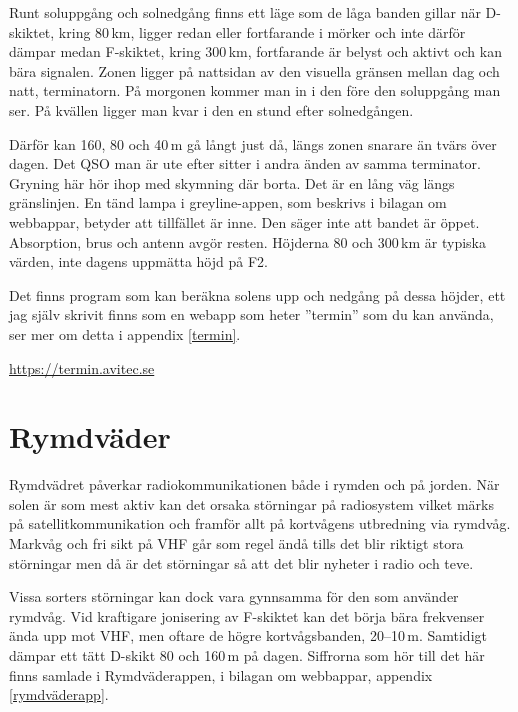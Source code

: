 Runt soluppgång och solnedgång finns ett läge som de låga banden
gillar när D-skiktet, kring 80\,km, ligger redan eller fortfarande i
mörker och inte därför dämpar medan F-skiktet, kring 300\,km,
fortfarande är belyst och aktivt och kan bära signalen. Zonen ligger
på nattsidan av den visuella gränsen mellan dag och natt,
terminatorn. På morgonen kommer man in i den före den soluppgång man
ser. På kvällen ligger man kvar i den en stund efter solnedgången.

Därför kan 160, 80 och 40\,m gå långt just då, längs zonen snarare än
tvärs över dagen. Det QSO man är ute efter sitter i andra änden av
samma terminator. Gryning här hör ihop med skymning där borta. Det är
en lång väg längs gränslinjen. En tänd lampa i greyline-appen, som
beskrivs i bilagan om webbappar, betyder att tillfället är inne. Den
säger inte att bandet är öppet. Absorption, brus och antenn avgör
resten. Höjderna 80 och 300\,km är typiska värden, inte dagens
uppmätta höjd på F2.

Det finns program som kan beräkna solens upp och nedgång på dessa
höjder, ett jag själv skrivit finns som en webapp som heter ''termin''
som du kan använda, ser mer om detta i appendix \ref{termin}.

\url{https://termin.avitec.se}


\section{Rymdväder}
\label{sec:rymdvader}

Rymdvädret påverkar radiokommunikationen både i rymden och på
jorden. När solen är som mest aktiv kan det orsaka störningar på
radiosystem vilket märks på satellitkommunikation och framför allt på
kortvågens utbredning via rymdvåg. Markvåg och fri sikt på VHF går som
regel ändå tills det blir riktigt stora störningar men då är det
störningar så att det blir nyheter i radio och teve.

Vissa sorters störningar kan dock vara gynnsamma för den som använder
rymdvåg. Vid kraftigare jonisering av F-skiktet kan det börja bära
frekvenser ända upp mot VHF, men oftare de högre kortvågsbanden,
20--10\,m. Samtidigt dämpar ett tätt D-skikt 80 och 160\,m på
dagen. Siffrorna som hör till det här finns samlade i Rymdväderappen,
i bilagan om webbappar, appendix \ref{rymdväderapp}.

